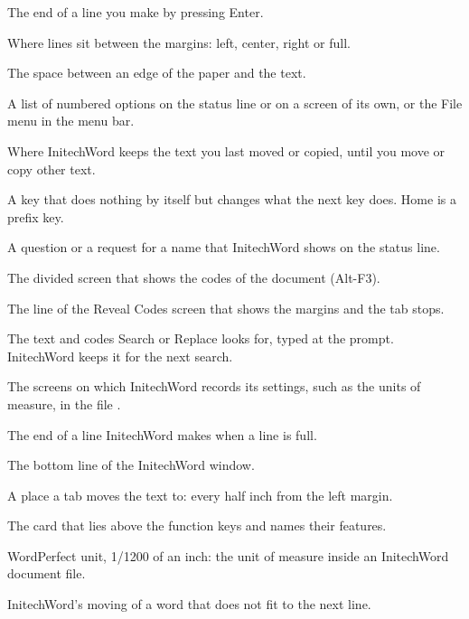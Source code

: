 The end of a line you make by pressing Enter.

Where lines sit between the margins: left, center, right or full.

The space between an edge of the paper and the text.

A list of numbered options on the status line or on a screen of its own, or
the File menu in the menu bar.

Where InitechWord keeps the text you last moved or copied, until you move or
copy other text.

A key that does nothing by itself but changes what the next key does.  Home
is a prefix key.

A question or a request for a name that InitechWord shows on the status
line.

The divided screen that shows the codes of the document (Alt-F3).

The line of the Reveal Codes screen that shows the margins and the tab
stops.

The text and codes Search or Replace looks for, typed at the 
prompt.  InitechWord keeps it for the next search.

The screens on which InitechWord records its settings, such as the units of
measure, in the file .

The end of a line InitechWord makes when a line is full.

The bottom line of the InitechWord window.

A place a tab moves the text to: every half inch from the left margin.

The card that lies above the function keys and names their features.

WordPerfect unit, 1/1200 of an inch: the unit of measure inside an
InitechWord document file.

InitechWord's moving of a word that does not fit to the next line.
